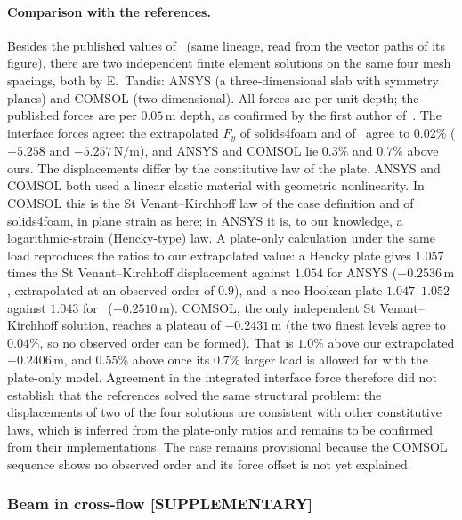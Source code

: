 \paragraph{Comparison with the references.}
Besides the published values of~\citet{Tukovic2018} (same lineage, read from the vector paths of its figure), there are two independent finite element solutions on the same four mesh spacings, both by E.~Tandis: ANSYS (a three-dimensional slab with symmetry planes) and COMSOL (two-dimensional). All forces are per unit depth; the published forces are per $0.05\,\mathrm{m}$ depth, as confirmed by the first author of~\citet{Tukovic2018}.
The interface forces agree: the extrapolated $F_y$ of solids4foam and of~\citet{Tukovic2018} agree to $0.02\%$ ($-5.258$ and $-5.257\,\mathrm{N/m}$), and ANSYS and COMSOL lie $0.3\%$ and $0.7\%$ above ours.
The displacements differ by the constitutive law of the plate. ANSYS and COMSOL both used a linear elastic material with geometric nonlinearity. In COMSOL this is the St Venant--Kirchhoff law of the case definition and of solids4foam, in plane strain as here; in ANSYS it is, to our knowledge, a logarithmic-strain (Hencky-type) law.
A plate-only calculation under the same load reproduces the ratios to our extrapolated value: a Hencky plate gives $1.057$ times the St Venant--Kirchhoff displacement against $1.054$ for ANSYS ($-0.2536\,\mathrm{m}$, extrapolated at an observed order of $0.9$), and a neo-Hookean plate $1.047$--$1.052$ against $1.043$ for~\citet{Tukovic2018} ($-0.2510\,\mathrm{m}$).
COMSOL, the only independent St Venant--Kirchhoff solution, reaches a plateau of $-0.2431\,\mathrm{m}$ (the two finest levels agree to $0.04\%$, so no observed order can be formed). That is $1.0\%$ above our extrapolated $-0.2406\,\mathrm{m}$, and $0.55\%$ above once its $0.7\%$ larger load is allowed for with the plate-only model.
Agreement in the integrated interface force therefore did not establish that the references solved the same structural problem: the displacements of two of the four solutions are consistent with other constitutive laws, which is inferred from the plate-only ratios and remains to be confirmed from their implementations. The case remains provisional because the COMSOL sequence shows no observed order and its force offset is not yet explained.

\subsubsection{Beam in cross-flow [SUPPLEMENTARY]}\label{sec:beam}

